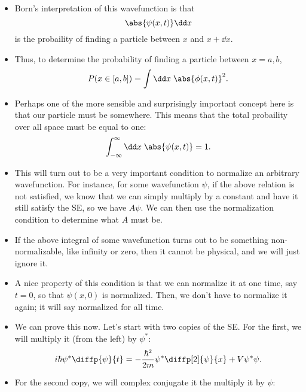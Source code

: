 \begin{itemize}
    \item Born's interpretation of this wavefunction is that 
        \begin{equation}
            \abs{\psi(x,t)} \dd x
        \end{equation}
        is the probaility of finding a particle between $x$ and $x + \dd x$.
    \item Thus, to determine the probability of finding a particle between $x=a,b$, 
        \begin{equation}
            P(x \in [a,b]) = \int \dd x\; \abs{\phi(x,t)}^2.
        \end{equation}
    \item Perhaps one of the more sensible and surprisingly important concept here is that our particle must be somewhere. This means that the total probaility over all space must be equal to one:
        \begin{equation}
            \int_{-\infty}^{\infty} \dd x\; \abs{\psi(x,t)} = 1.
        \end{equation}
    \item This will turn out to be a very important condition to normalize an arbitrary wavefunction. For instance, for some wavefunction $\psi$, if the above relation is not satisfied, we know that we can simply multiply by a constant and have it still satisfy the SE, so we have $A\psi$. We can then use the normalization condition to determine what $A$ must be.
    \item If the above integral of some wavefunction turns out to be something non-normalizable, like infinity or zero, then it cannot be physical, and we will just ignore it.
    \item A nice property of this condition is that we can normalize it at one time, say $t=0$, so that $\psi(x,0)$ is normalized. Then, we don't have to normalize it again; it will say normalized for all time.
    \item We can prove this now. Let's start with two copies of the SE. For the first, we will multiply it (from the left) by $\psi^*$:
        \begin{equation}
            i\hbar \psi^* \diffp{\psi}{t} = -\frac{\hbar^2}{2m} \psi^*\diffp[2]{\psi}{x} + V\psi^*\psi.
        \end{equation}
    \item For the second copy, we will complex conjugate it the multiply it by $\psi$:
        \begin{equation}

\end{equation}
\end{itemize}

